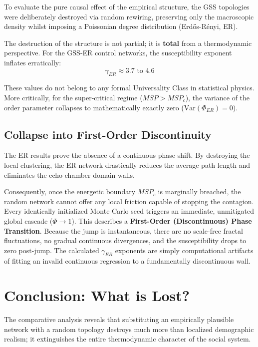 \documentclass[12pt, a4paper]{article}
\begin{document}
To evaluate the pure causal effect of the empirical structure, the GSS topologies were deliberately destroyed via random rewiring, preserving only the macroscopic density whilst imposing a Poissonian degree distribution (Erdős-Rényi, ER).

The destruction of the structure is not partial; it is \textbf{total} from a thermodynamic perspective. For the GSS-ER control networks, the susceptibility exponent inflates erratically:
\begin{equation}
    \gamma_{ER} \approx 3.7 \text{ to } 4.6
\end{equation}

These values do not belong to any formal Universality Class in statistical physics. More critically, for the super-critical regime ($MSP > MSP_c$), the variance of the order parameter collapses to mathematically exactly zero ($\text{Var}(\Phi_{ER}) = 0$).

\subsection{Collapse into First-Order Discontinuity}
The ER results prove the absence of a continuous phase shift. By destroying the local clustering, the ER network drastically reduces the average path length and eliminates the echo-chamber domain walls. 

Consequently, once the energetic boundary $MSP_c$ is marginally breached, the random network cannot offer any local friction capable of stopping the contagion. Every identically initialized Monte Carlo seed triggers an immediate, unmitigated global cascade ($\Phi \to 1$). This describes a \textbf{First-Order (Discontinuous) Phase Transition}. Because the jump is instantaneous, there are no scale-free fractal fluctuations, no gradual continuous divergences, and the susceptibility drops to zero post-jump. The calculated $\gamma_{ER}$ exponents are simply computational artifacts of fitting an invalid continuous regression to a fundamentally discontinuous wall.

\section{Conclusion: What is Lost?}

The comparative analysis reveals that substituting an empirically plausible network with a random topology destroys much more than localized demographic realism; it extinguishes the entire thermodynamic character of the social system. 
\end{document}

